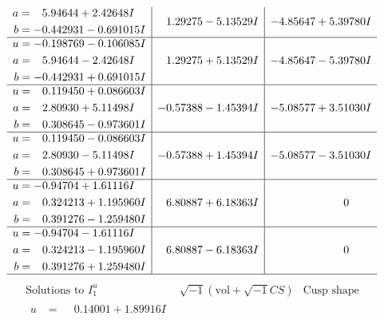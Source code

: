\documentclass[1p]{elsarticle_modified}
\theoremstyle{definition}
\newcommand{\I}{\sqrt{-1}}
\begin{document}
$$\begin{array}{c|c|c}
\begin{aligned}
a &= \phantom{-}5.94644 + 2.42648 I \\
b &= -0.442931 - 0.691015 I\end{aligned}
 & \phantom{-}1.29275 - 5.13529 I & -4.85647 + 5.39780 I \\ \hline\begin{aligned}
u &= -0.198769 - 0.106085 I \\
a &= \phantom{-}5.94644 - 2.42648 I \\
b &= -0.442931 + 0.691015 I\end{aligned}
 & \phantom{-}1.29275 + 5.13529 I & -4.85647 - 5.39780 I \\ \hline\begin{aligned}
u &= \phantom{-}0.119450 + 0.086603 I \\
a &= \phantom{-}2.80930 + 5.11498 I \\
b &= \phantom{-}0.308645 - 0.973601 I\end{aligned}
 & -0.57388 - 1.45394 I & -5.08577 + 3.51030 I \\ \hline\begin{aligned}
u &= \phantom{-}0.119450 - 0.086603 I \\
a &= \phantom{-}2.80930 - 5.11498 I \\
b &= \phantom{-}0.308645 + 0.973601 I\end{aligned}
 & -0.57388 + 1.45394 I & -5.08577 - 3.51030 I \\ \hline\begin{aligned}
u &= -0.94704 + 1.61116 I \\
a &= \phantom{-}0.324213 + 1.195960 I \\
b &= \phantom{-}0.391276 - 1.259480 I\end{aligned}
 & \phantom{-}6.80887 + 6.18363 I & \phantom{-0.000000 } 0 \\ \hline\begin{aligned}
u &= -0.94704 - 1.61116 I \\
a &= \phantom{-}0.324213 - 1.195960 I \\
b &= \phantom{-}0.391276 + 1.259480 I\end{aligned}
 & \phantom{-}6.80887 - 6.18363 I & \phantom{-0.000000 } 0\\
 \hline 
 \end{array}$$\newpage$$\begin{array}{c|c|c}  
\text{Solutions to }I^u_{1}& \I (\text{vol} + \sqrt{-1}CS) & \text{Cusp shape}\\
 \hline 
\begin{aligned}
u &= \phantom{-}0.14001 + 1.89916 I \\

\end{aligned}
\end{array}$$
\end{document}
